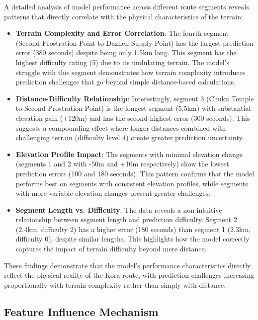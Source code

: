 \documentclass[12pt]{article}
\begin{document}
A detailed analysis of model performance across different route segments reveals patterns that directly correlate with the physical characteristics of the terrain:

\begin{itemize}
  \item \textbf{Terrain Complexity and Error Correlation}: The fourth segment (Second Prostration Point to Dazhen Supply Point) has the largest prediction error (380 seconds) despite being only 1.5km long. This segment has the highest difficulty rating (5) due to its undulating terrain. The model's struggle with this segment demonstrates how terrain complexity introduces prediction challenges that go beyond simple distance-based calculations.
  
  \item \textbf{Distance-Difficulty Relationship}: Interestingly, segment 3 (Chuku Temple to Second Prostration Point) is the longest segment (5.5km) with substantial elevation gain (+120m) and has the second-highest error (300 seconds). This suggests a compounding effect where longer distances combined with challenging terrain (difficulty level 4) create greater prediction uncertainty.
  
  \item \textbf{Elevation Profile Impact}: The segments with minimal elevation change (segments 1 and 2 with -50m and +10m respectively) show the lowest prediction errors (100 and 180 seconds). This pattern confirms that the model performs best on segments with consistent elevation profiles, while segments with more variable elevation changes present greater challenges.
  
  \item \textbf{Segment Length vs. Difficulty}: The data reveals a non-intuitive relationship between segment length and prediction difficulty. Segment 2 (2.4km, difficulty 2) has a higher error (180 seconds) than segment 1 (2.3km, difficulty 0), despite similar lengths. This highlights how the model correctly captures the impact of terrain difficulty beyond mere distance.
\end{itemize}

These findings demonstrate that the model's performance characteristics directly reflect the physical reality of the Kora route, with prediction challenges increasing proportionally with terrain complexity rather than simply with distance.

\subsection{Feature Influence Mechanism}
\end{document}
